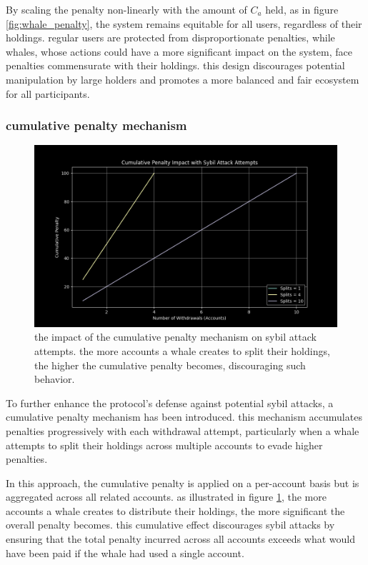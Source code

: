 \documentclass{article}
\begin{document}
By scaling the penalty non-linearly with the amount of $C_a$ held, as in figure \ref{fig:whale_penalty}, the system remains equitable for all users, regardless of their holdings. regular users are protected from disproportionate penalties, while whales, whose actions could have a more significant impact on the system, face penalties commensurate with their holdings. this design discourages potential manipulation by large holders and promotes a more balanced and fair ecosystem for all participants.

\subsubsection{cumulative penalty mechanism}


\begin{figure}[h]
\centering
\includegraphics[width=\textwidth]{images/9.png}
\caption{the impact of the cumulative penalty mechanism on sybil attack attempts. the more accounts a whale creates to split their holdings, the higher the cumulative penalty becomes, discouraging such behavior.}
\label{fig:cumulative_penalty}
\end{figure}


To further enhance the protocol's defense against potential sybil attacks, a cumulative penalty mechanism has been introduced. this mechanism accumulates penalties progressively with each withdrawal attempt, particularly when a whale attempts to split their holdings across multiple accounts to evade higher penalties.

In this approach, the cumulative penalty is applied on a per-account basis but is aggregated across all related accounts. as illustrated in figure \ref{fig:cumulative_penalty}, the more accounts a whale creates to distribute their holdings, the more significant the overall penalty becomes. this cumulative effect discourages sybil attacks by ensuring that the total penalty incurred across all accounts exceeds what would have been paid if the whale had used a single account.
\end{document}
